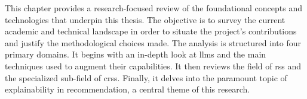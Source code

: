 This chapter provides a research-focused review of the foundational concepts and technologies that underpin this thesis. The objective is to survey the current academic and technical landscape in order to situate the project's contributions and justify the methodological choices made. The analysis is structured into four primary domains. It begins with an in-depth look at \acp{llm} and the main techniques used to augment their capabilities. It then reviews the field of \acp{rs} and the specialized sub-field of \acp{crs}. Finally, it delves into the paramount topic of explainability in recommendation, a central theme of this research.